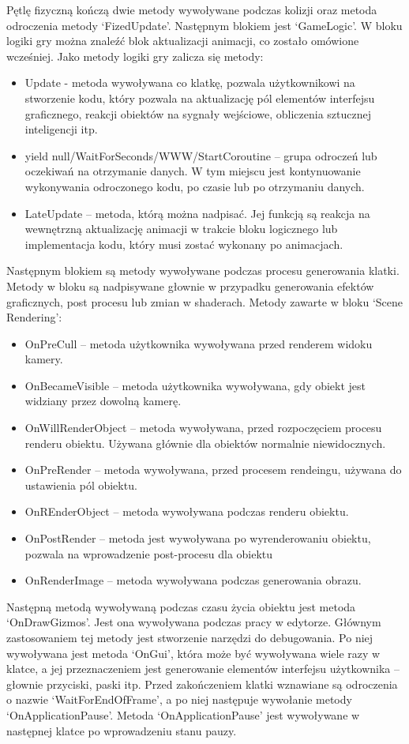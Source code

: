 \documentclass[12pt,twoside]{article}
\begin{document}
Pętlę fizyczną kończą dwie metody wywoływane podczas kolizji oraz metoda
odroczenia metody ‘FizedUpdate’. Następnym blokiem jest ‘GameLogic’. W bloku
logiki gry można znaleźć blok aktualizacji animacji, co zostało omówione
wcześniej. Jako metody logiki gry zalicza się metody:
\begin{itemize}
\item Update - metoda wywoływana co klatkę, pozwala użytkownikowi na stworzenie
kodu, który pozwala na aktualizację pól elementów interfejsu graficznego,
reakcji obiektów na sygnały wejściowe, obliczenia sztucznej inteligencji itp. 
\item yield null/WaitForSeconds/WWW/StartCoroutine – grupa odroczeń lub
oczekiwań na otrzymanie danych. W tym miejscu jest kontynuowanie wykonywania
odroczonego kodu, po czasie lub po otrzymaniu danych. 
\item LateUpdate – metoda, którą można nadpisać. Jej funkcją są reakcja na
wewnętrzną aktualizację animacji w trakcie bloku logicznego lub implementacja
kodu, który musi zostać wykonany po animacjach. 
\end{itemize}
Następnym blokiem są metody wywoływane podczas procesu generowania klatki.
Metody w bloku są nadpisywane głownie w przypadku generowania efektów
graficznych, post procesu lub zmian w shaderach. Metody zawarte w bloku ‘Scene
Rendering’:
\begin{itemize}
\item OnPreCull – metoda użytkownika wywoływana przed renderem widoku kamery. 
\item OnBecameVisible – metoda użytkownika wywoływana, gdy obiekt jest widziany
przez dowolną kamerę. 
\item OnWillRenderObject – metoda wywoływana, przed rozpoczęciem procesu renderu
obiektu. Używana głównie dla obiektów normalnie niewidocznych.
\item OnPreRender – metoda wywoływana, przed procesem rendeingu, używana do
ustawienia pól obiektu.
\item OnREnderObject – metoda wywoływana podczas renderu obiektu.
\item OnPostRender – metoda jest wywoływana po wyrenderowaniu obiektu, pozwala
na wprowadzenie post-procesu dla obiektu
\item OnRenderImage – metoda wywoływana podczas generowania obrazu.
\end{itemize}
Następną metodą wywoływaną podczas czasu życia obiektu jest metoda
‘OnDrawGizmos’. Jest ona wywoływana podczas pracy w edytorze. Głównym
zastosowaniem tej metody jest stworzenie narzędzi do debugowania. Po niej
wywoływana jest metoda ‘OnGui’, która może być wywoływana wiele razy w klatce, a
jej przeznaczeniem jest generowanie elementów interfejsu użytkownika – głownie
przyciski, paski itp. Przed zakończeniem klatki wznawiane są odroczenia o nazwie
‘WaitForEndOfFrame’, a po niej następuje wywołanie metody ‘OnApplicationPause’.
Metoda ‘OnApplicationPause’ jest wywoływane w następnej klatce po wprowadzeniu
stanu pauzy.
\end{document}
